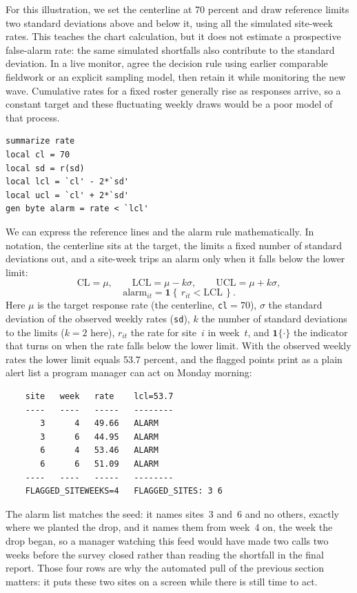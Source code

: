 \documentclass[
    a4paper,
    fontsize=10pt,
    twoside=true,
    numbers=noenddot,
]{kaobook}
\begin{document}
For this illustration, we set the centerline at 70 percent and draw reference limits two standard deviations above and below it, using all the simulated site-week rates. This teaches the chart calculation, but it does not estimate a prospective false-alarm rate: the same simulated shortfalls also contribute to the standard deviation. In a live monitor, agree the decision rule using earlier comparable fieldwork or an explicit sampling model, then retain it while monitoring the new wave. Cumulative rates for a fixed roster generally rise as responses arrive, so a constant target and these fluctuating weekly draws would be a poor model of that process.
\par
{\footnotesize
\begin{verbatim}
summarize rate
local cl = 70
local sd = r(sd)
local lcl = `cl' - 2*`sd'
local ucl = `cl' + 2*`sd'
gen byte alarm = rate < `lcl'
\end{verbatim}
}
We can express the reference lines and the alarm rule mathematically. In notation, the centerline sits at the target, the limits a fixed number of standard deviations out, and a site-week trips an alarm only when it falls below the lower limit:
\[
  \text{CL}=\mu,\qquad
  \text{LCL}=\mu-k\sigma,\qquad
  \text{UCL}=\mu+k\sigma,
\]
\[
  \text{alarm}_{it}=\mathbf{1}\!\left\{\,r_{it}<\text{LCL}\,\right\}.
\]
Here $\mu$ is the target response rate (the centerline, \texttt{cl}$=70$), $\sigma$ the standard deviation of the observed weekly rates (\texttt{sd}), $k$ the number of standard deviations to the limits ($k=2$ here), $r_{it}$ the rate for site~$i$ in week~$t$, and $\mathbf{1}\{\cdot\}$ the indicator that turns on when the rate falls below the lower limit. With the observed weekly rates the lower limit equals 53.7 percent, and the flagged points print as a plain alert list a program manager can act on Monday morning:
\par
{\footnotesize
\begin{verbatim}
    site   week   rate    lcl=53.7
    ----   ----   -----   --------
       3      4   49.66   ALARM
       3      6   44.95   ALARM
       6      4   53.46   ALARM
       6      6   51.09   ALARM
    ----   ----   -----   --------
    FLAGGED_SITEWEEKS=4   FLAGGED_SITES: 3 6
\end{verbatim}
}
The alarm list matches the seed: it names sites~3 and~6 and no others, exactly where we planted the drop, and it names them from week~4 on, the week the drop began, so a manager watching this feed would have made two calls two weeks before the survey closed rather than reading the shortfall in the final report. Those four rows are why the automated pull of the previous section matters: it puts these two sites on a screen while there is still time to act.
\end{document}

